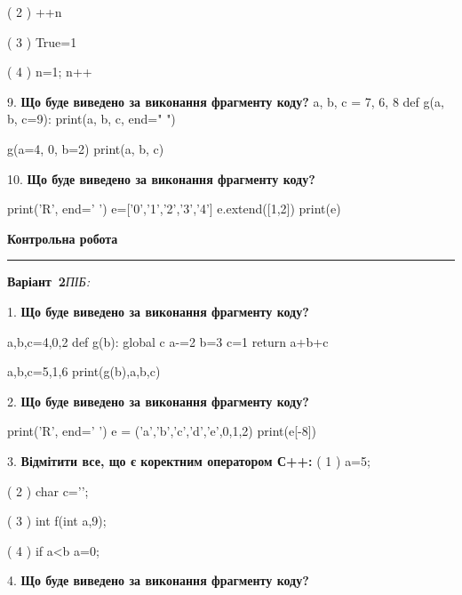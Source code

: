 \documentclass[11pt]{article}
\begin{document}
( 2 ) ++n

( 3 ) True=1

( 4 ) n=1; n++
\par\vspace{5mm}
9. \textbf{Що буде виведено за виконання фрагменту коду?}
a, b, c = 7, 6, 8
def g(a, b, c=9):
    print(a, b, c, end=" ")

g(a=4, 0, b=2)
print(a, b, c)
\par\vspace{5mm}
10. \textbf{Що буде виведено за виконання фрагменту коду?}

print('R', end=' ')
e=['0','1','2','3','4']
e.extend([1,2])
print(e)

\par\vspace{5mm}










\newpage

\newpage

{\centering\Large\bfseries Контрольна робота\par}
\medskip
\noindent\rule{\linewidth}{0.5pt}
\smallskip
\noindent\textbf{Варіант \No\,2}\hfill \textit{ПІБ:}\,\underline{\hspace{60mm}}
\vspace{4mm}

1. \textbf{Що буде виведено за виконання фрагменту коду?}

a,b,c=4,0,2
def g(b):
global c    a-=2
    b=3
    c=1
    return a+b+c

a,b,c=5,1,6
print(g(b),a,b,c)
\par\vspace{5mm}
2. \textbf{Що буде виведено за виконання фрагменту коду?}

print('R', end=' ')
e = ('a','b','c','d','e',0,1,2)
print(e[-8])

\par\vspace{5mm}
3. %
\textbf{Відмітити все, що є коректним оператором С++:}
( 1 ) {a=5;}

( 2 ) char c='\n';

( 3 ) int f(int a,9);

( 4 ) if a<b a=0;
\par\vspace{5mm}
4. \textbf{Що буде виведено за виконання фрагменту коду?}
\end{document}

